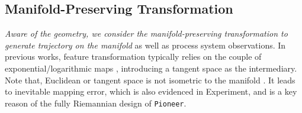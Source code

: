 






\subsection{Manifold-Preserving Transformation} 
\emph{Aware of the geometry, we consider the manifold-preserving transformation to generate trajectory on the manifold} as well as process system observations.
In previous works, feature transformation typically relies on the couple of exponential/logarithmic maps \cite{nips22QGCN},
introducing a tangent space as the intermediary.
Note that, Euclidean or tangent space is not isometric to the manifold \cite{Petersen16,Yu2022RandomLF}.
It leads to  inevitable mapping error, which is also evidenced in Experiment, and is  a key reason of the fully Riemannian design of \texttt{Pioneer}.

